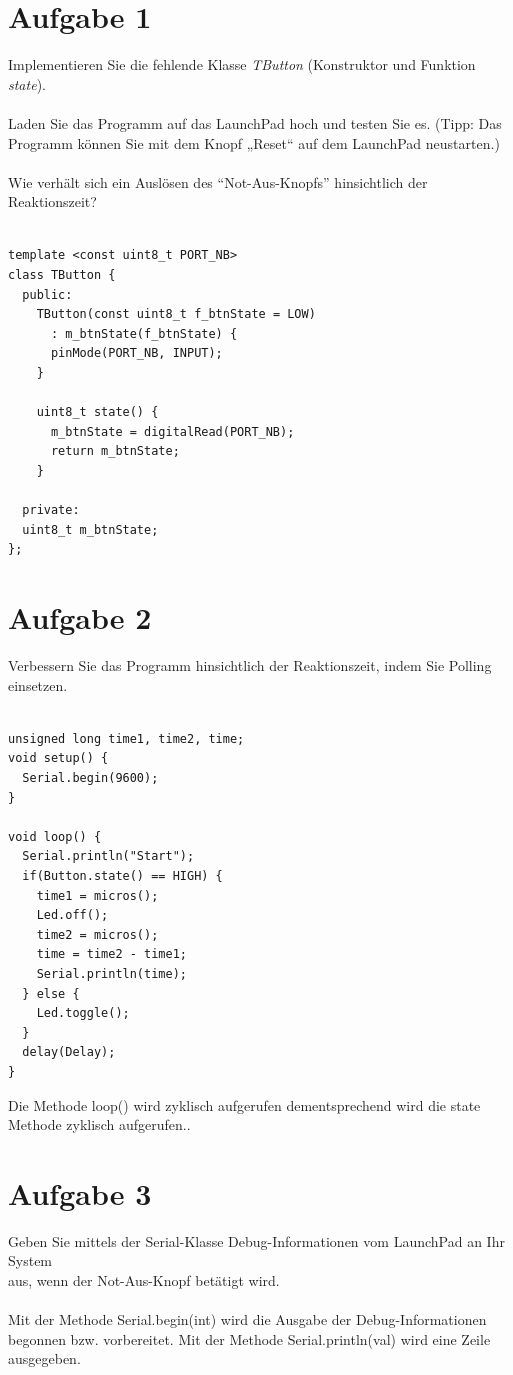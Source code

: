 \section{Aufgabe 1}
Implementieren Sie die fehlende Klasse \textit{TButton} (Konstruktor und Funktion \textit{state}).\\ \\
Laden Sie das Programm auf das LaunchPad hoch und testen Sie es. (Tipp: Das\\
Programm können Sie mit dem Knopf „Reset“ auf dem LaunchPad neustarten.)\\ \\
Wie verhält sich ein Auslösen des “Not-Aus-Knopfs” hinsichtlich der Reaktionszeit?\\ \\
\begin{lstlisting}[label =lst:bash]
template <const uint8_t PORT_NB>
class TButton {
  public:
    TButton(const uint8_t f_btnState = LOW)
      : m_btnState(f_btnState) {
      pinMode(PORT_NB, INPUT);
    }

    uint8_t state() {
      m_btnState = digitalRead(PORT_NB);
      return m_btnState;
    }

  private:
  uint8_t m_btnState;
};
\end{lstlisting}
\newpage
\section{Aufgabe 2}
Verbessern Sie das Programm hinsichtlich der Reaktionszeit, indem Sie Polling einsetzen.\\ \\
\begin{lstlisting}[label =lst:bash]
unsigned long time1, time2, time;
void setup() {
  Serial.begin(9600);
}

void loop() {
  Serial.println("Start");  
  if(Button.state() == HIGH) {
    time1 = micros();
    Led.off();
    time2 = micros();
    time = time2 - time1;
    Serial.println(time);
  } else {
    Led.toggle(); 
  }
  delay(Delay);   
}
\end{lstlisting}
Die Methode loop() wird zyklisch aufgerufen dementsprechend wird die state Methode zyklisch aufgerufen..\\
\section{Aufgabe 3}
Geben Sie mittels der Serial-Klasse Debug-Informationen vom LaunchPad an Ihr System\\
aus, wenn der Not-Aus-Knopf betätigt wird.\\ \\
Mit der Methode Serial.begin(int) wird die Ausgabe der Debug-Informationen begonnen bzw. vorbereitet. Mit der Methode Serial.println(val) wird eine Zeile ausgegeben.\\ \\
\newpage
